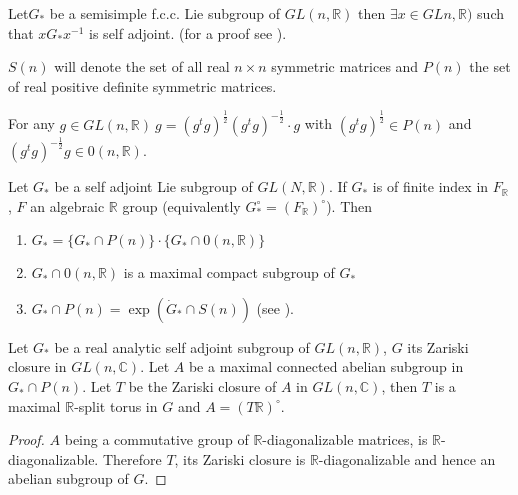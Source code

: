 \begin{thm}\label{chap1:thm1.2} %
  Let\pageoriginale $G_*$ be a semisimple f.c.c. Lie subgroup of $GL(n, \mathbb{R})$
  then $\exists x \in GL n, \mathbb{R})$ such that $x G_*
  x^{-1}$ is self adjoint. (for a proof see \cite{12}).
\end{thm}

\begin{notns}
  $S(n)$ will denote the set of all real $n \times n$ symmetric matrices
  and $P(n)$ the set of real positive definite symmetric matrices.
\end{notns}

For any $g\in GL (n, \mathbb{R})~ g= (g^t g)^{\frac{1}{2}}(g^t
g)^{-\frac{1}{2}}\cdot g$ with $(g^t g)^{\frac{1}{2}}\in P(n)$
and $(g^t g)^{-\frac{1}{2}}g \in 0 (n, \mathbb{R})$. 

\begin{thm}\label{chap1:thm1.3} %
  Let $G_*$ be a self adjoint Lie subgroup of $GL (N, \mathbb{R})$. If
  $G_*$ is of finite index in $F_\mathbb{R}$, $F$ an algebraic
  $\mathbb{R}$ group (equivalently $G^\circ_*=
  (F_\mathbb{R})^\circ$). Then
  \begin{enumerate}[\rm 1.]
    \item $G_* = \{ G_* \cap P(n) \}\cdot \{ G_* \cap 0 (n,
      \mathbb{R})\}$
      \item $G_* \cap 0(n, \mathbb{R})$ is a maximal compact subgroup
        of $G_*$
        \item $G_* \cap P(n)= \exp (\dot{G}_* \cap S(n))$ (see \cite{12}).
  \end{enumerate}
\end{thm}

\begin{lemma}\label{chap1:lem1.4} %
  Let $G_*$ be a real analytic self adjoint subgroup of $GL(n,
  \mathbb{R})$, $G$ its Zariski closure in $GL (n, \mathbb{C})$. Let
  $A$ be a maximal connected abelian subgroup in $G_* \cap P(n)$. Let
  $T$ be the Zariski closure of $A$ in $GL (n, \mathbb{C})$, then $T$
  is a maximal $\mathbb{R}$-split torus in $G$ and $A= (T\mathbb{R})^\circ$.
\end{lemma}

\begin{proof}
  $A$ being a commutative group of $\mathbb{R}$-diagonalizable
  matrices, is $\mathbb{R}$-diagonalizable. Therefore $T$, its Zariski
  closure is $\mathbb{R}$-diagonalizable and hence an abelian subgroup
  of $G$.
\end{proof}

